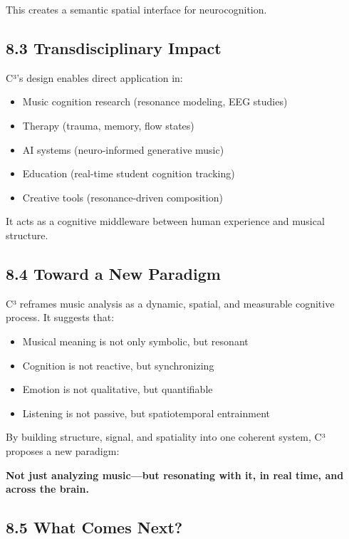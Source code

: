 This creates a semantic spatial interface for neurocognition.

\subsection*{8.3 Transdisciplinary Impact}

C³’s design enables direct application in:

\begin{itemize}
    \item Music cognition research (resonance modeling, EEG studies)
    \item Therapy (trauma, memory, flow states)
    \item AI systems (neuro-informed generative music)
    \item Education (real-time student cognition tracking)
    \item Creative tools (resonance-driven composition)
\end{itemize}

It acts as a cognitive middleware between human experience and musical structure.

\subsection*{8.4 Toward a New Paradigm}

C³ reframes music analysis as a dynamic, spatial, and measurable cognitive process. It suggests that:

\begin{itemize}
    \item Musical meaning is not only symbolic, but resonant
    \item Cognition is not reactive, but synchronizing
    \item Emotion is not qualitative, but quantifiable
    \item Listening is not passive, but spatiotemporal entrainment
\end{itemize}

By building structure, signal, and spatiality into one coherent system, C³ proposes a new paradigm:

\textbf{Not just analyzing music—but resonating with it, in real time, and across the brain.}

\subsection*{8.5 What Comes Next?}

